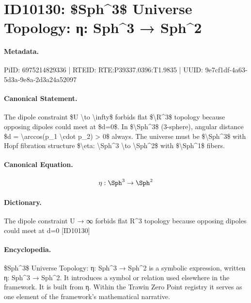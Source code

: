 \section*{ID10130: \$Sph\textasciicircum{}3\$ Universe Topology: η: Sph\textasciicircum{}3 → Sph\textasciicircum{}2}
\paragraph{Metadata.}
PiID: 6975214829336 | RTEID: RTE:P39337.0396:T1.9835 | UUID: 9e7cf1df-4a63-5d3a-9e8a-2d3a24a52097

\paragraph{Canonical Statement.}
The dipole constraint \$U \textbackslash{}to \textbackslash{}infty\$ forbids flat \$\textbackslash{}R\textasciicircum{}3\$ topology because opposing dipoles could meet at \$d=0\$. In \$\textbackslash{}Sph\textasciicircum{}3\$ (3-sphere), angular distance \$d = \textbackslash{}arccos(p\_1 \textbackslash{}cdot p\_2) > 0\$ always. The universe must be \$\textbackslash{}Sph\textasciicircum{}3\$ with Hopf fibration structure \$\textbackslash{}eta: \textbackslash{}Sph\textasciicircum{}3 \textbackslash{}to \textbackslash{}Sph\textasciicircum{}2\$ with \$\textbackslash{}Sph\textasciicircum{}1\$ fibers.

\paragraph{Canonical Equation.}
\[
\eta: \Sph^3 \to \Sph^2
\]

\paragraph{Dictionary.}
The dipole constraint U → ∞ forbids flat R\textasciicircum{}3 topology because opposing dipoles could meet at d=0 [ID10130]

\paragraph{Encyclopedia.}
\$Sph\textasciicircum{}3\$ Universe Topology: η: Sph\textasciicircum{}3 → Sph\textasciicircum{}2 is a symbolic expression, written η: Sph\textasciicircum{}3 → Sph\textasciicircum{}2. It introduces a symbol or relation used elsewhere in the framework. It is built from η. Within the Trawin Zero Point registry it serves as one element of the framework's mathematical narrative.
